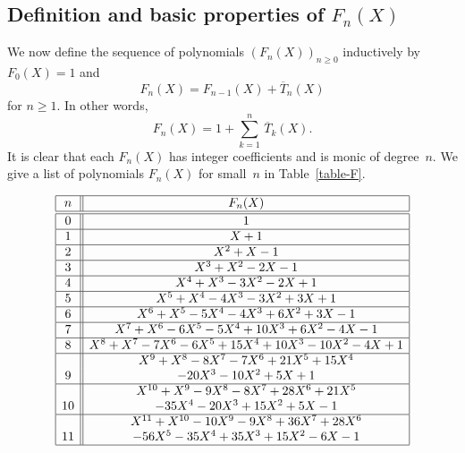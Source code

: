 \documentclass[11pt, a4paper]{amsart}
\theoremstyle{definition}
\newcommand\TT{\overline{T}}
\numberwithin{equation}{section}
\begin{document}
\subsection{Definition and basic properties of $F_n(X)$}\label{ssec-F}

We now define the sequence of polynomials $(F_n(X))_{n\geq 0}$ inductively by $F_0(X) = 1$ and
\begin{equation}\label{def-F}
F_n(X) = F_{n-1}(X) + \TT_n(X)
\end{equation}
for $n\geq 1$. In other words,
\begin{equation}\label{def-F2}
F_n(X) = 1 + \sum_{k=1}^n \, \TT_k(X) .
\end{equation}
It is clear that each $F_n(X) $ has integer coefficients and is monic of degree~$n$.
We give a list of polynomials $F_n(X)$ for small~$n$ in Table~\ref{table-F}.

\begin{table}[ht]
\caption{\emph{The polynomials $F_n (X)$}}\label{table-F}
\renewcommand\arraystretch{1.25}
\noindent\[
\begin{array}{|c||c|}
\hline
n & F_n(X)  \\
\hline\hline
0 & 1  \\ 
\hline
1 & X + 1   \\
\hline
2 & X^2 + X - 1 \\ 
\hline
3 & X^3 + X^2 - 2X -1  \\ 
\hline
4 & X^4 + X^3 - 3 X^2 - 2X +1 \\ 
\hline
5 &  X^5 + X^4 - 4X^3 - 3 X^2 + 3X + 1  \\
\hline
6 & X^6 + X^5 - 5 X^4 -4 X^3 + 6X^2 + 3X -1 \\ 
\hline
7 & X^7 +X^6 - 6X^5 - 5 X^4 + 10 X^3 + 6 X^2 - 4X -1  \\ 
\hline
8 & X^8 + X^7 - 7 X^6 - 6 X^5 + 15 X^4 + 10 X^3 -10 X^2 -4 X +1  \\
\hline
&   X^9 + X^8 -8 X^7 -7 X^6  + 21 X^5 + 15 X^4  \\
9 &  - 20 X^3 - 10 X^2 + 5X + 1 \\
\hline
 &  X^{10} + X^9 - 9 X^8 - 8 X^7 + 28 X^6 + 21 X^5  \\
10 &   - 35 X^4 - 20 X^3 + 15 X^2 + 5X -1   \\
\hline
 & X^{11} + X^{10} - 10 X^9 - 9 X^8 + 36 X^7 + 28 X^6   \\
11 &  - 56 X^5 -35 X^4 + 35 X^3 + 15 X^2 - 6 X  - 1  \\
\hline
\end{array}
\]
\end{table}
\end{document}
